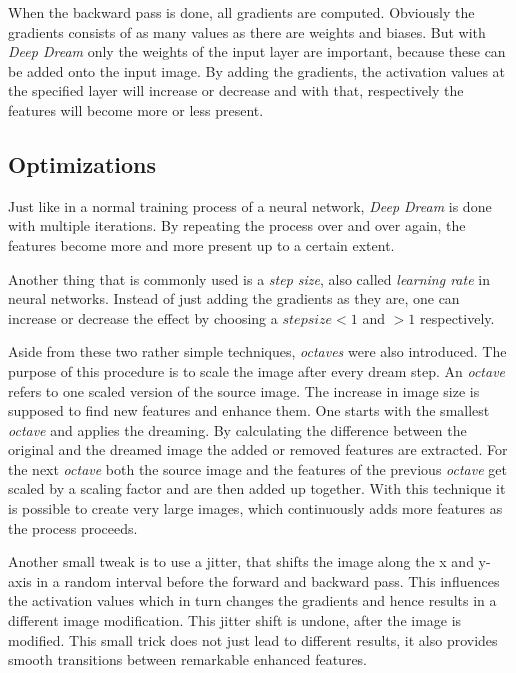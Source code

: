 When the backward pass is done, all gradients are computed.
Obviously the gradients consists of as many values as there are weights and biases.
But with \emph{Deep Dream} only the weights of the input layer are important, because these can be added onto the input image.
By adding the gradients, the activation values at the specified layer will increase or decrease and with that, respectively the features will become more or less present.\cite{deep-dream-blog}\cite{deep-dream-github}

\subsection{Optimizations}
\label{sec:optimizations}
Just like in a normal training process of a neural network, \emph{Deep Dream} is done with multiple iterations.
By repeating the process over and over again, the features become more and more present up to a certain extent.

Another thing that is commonly used is a \emph{step size}, also called \emph{learning rate} in neural networks.
Instead of just adding the gradients as they are, one can increase or decrease the effect by choosing a $step size < 1$ and $> 1$ respectively.

Aside from these two rather simple techniques, \emph{octaves} were also introduced.
The purpose of this procedure is to scale the image after every dream step.
An \textit{octave} refers to one scaled version of the source image.
The increase in image size is supposed to find new features and enhance them.
One starts with the smallest \textit{octave} and applies the dreaming.
By calculating the difference between the original and the dreamed image the added or removed features are extracted.
For the next \textit{octave} both the source image and the features of the previous \textit{octave} get scaled by a scaling factor and are then added up together.
With this technique it is possible to create very large images, which continuously adds more features as the process proceeds.

 
Another small tweak is to use a jitter, that shifts the image along the x and y-axis in a random interval before the forward and backward pass.
This influences the activation values which in turn changes the gradients and hence results in a different image modification.
This jitter shift is undone, after the image is modified.
This small trick does not just lead to different results, it also provides smooth transitions between remarkable enhanced features.


